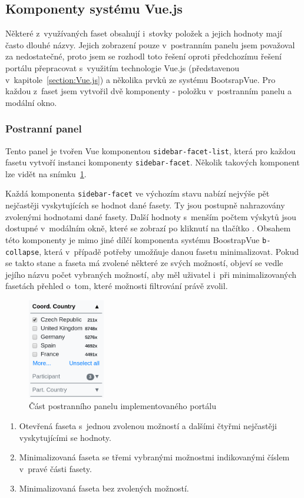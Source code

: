 \subsection{Komponenty systému Vue.js}
Některé z~využívaných faset obsahují i~stovky položek a jejich hodnoty mají často dlouhé názvy. Jejich zobrazení pouze v~postranním panelu jsem považoval za nedostatečné, proto jsem se rozhodl toto řešení oproti předchozímu řešení portálu přepracovat s~využitím technologie Vue.js (představenou v~kapitole~\ref{section:Vue.js}) a několika prvků ze systému BootsrapVue. Pro každou z~faset jsem vytvořil dvě komponenty - položku v~postranním panelu a modální okno.

\subsubsection*{Postranní panel}\label{section:sidebar}
Tento panel je tvořen Vue komponentou \texttt{sidebar-facet-list}, která pro každou fasetu vytvoří instanci komponenty \texttt{sidebar-facet}. Několik takových komponent lze vidět na snímku~\ref{img:sidebar}.

Každá komponenta \texttt{sidebar-facet} ve výchozím stavu nabízí nejvýše pět nejčastěji vyskytujících se hodnot dané fasety. Ty jsou postupně nahrazovány zvolenými hodnotami dané fasety. Další hodnoty s~menším počtem výskytů jsou dostupné v~modálním okně, které se zobrazí po kliknutí na tlačítko . Obsahem této komponenty je mimo jiné dílčí komponenta systému BoostrapVue \texttt{b-collapse}, která v~případě potřeby umožňuje danou fasetu minimalizovat. Pokud se takto stane a faseta má zvolené některé ze svých možností, objeví se vedle jejího názvu počet vybraných možností, aby měl uživatel i~při minimalizovaných fasetách přehled o~tom, které možnosti filtrování právě zvolil.

\begin{figure}[H]
	\centering
	\includegraphics[width=0.3\textwidth]{obrazky-figures/my-facet.png}
	\caption{Část postranního panelu implementovaného portálu}
	\label{img:sidebar}
\end{figure}
\begin{enumerate}
    \item Otevřená faseta  s~jednou zvolenou možností a dalšími čtyřmi nejčastěji vyskytujícími se hodnoty. %
    \item Minimalizovaná faseta  se třemi vybranými možnostmi indikovanými číslem v~pravé části fasety.
    \item Minimalizovaná faseta  bez zvolených možností.
\end{enumerate}


